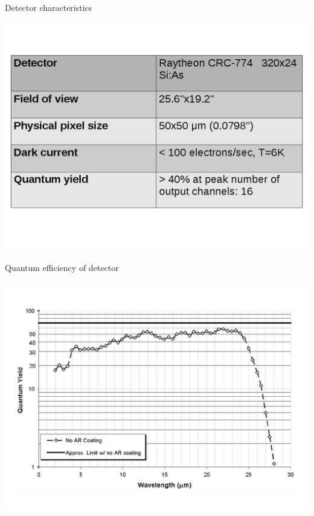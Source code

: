 \documentclass{beamer}
\begin{document}
\begin{frame}{Detector characteristics}
\begin{center}
\includegraphics[scale=0.35]{imgr7.png}
\end{center}
\end{frame}

\begin{frame}{Quantum efficiency of detector}
\begin{center}
\includegraphics[scale=0.35]{imgr8.png}
\end{center}
\end{frame}
\end{document}
